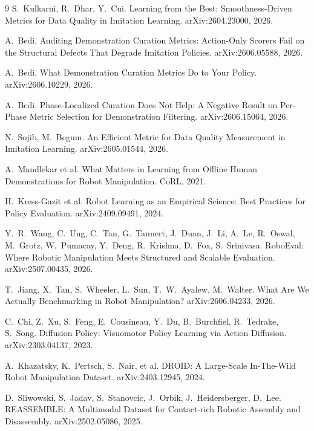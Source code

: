 \documentclass{article}
\begin{document}

\begin{thebibliography}{9}
S.~Kulkarni, R.~Dhar, Y.~Cui.
\newblock Learning from the Best: Smoothness-Driven Metrics for Data Quality
in Imitation Learning.
\newblock arXiv:2604.23000, 2026.

A.~Bedi.
\newblock Auditing Demonstration Curation Metrics: Action-Only Scorers Fail
on the Structural Defects That Degrade Imitation Policies.
\newblock arXiv:2606.05588, 2026.

A.~Bedi.
\newblock What Demonstration Curation Metrics Do to Your Policy.
\newblock arXiv:2606.10229, 2026.

A.~Bedi.
\newblock Phase-Localized Curation Does Not Help: A Negative Result on
Per-Phase Metric Selection for Demonstration Filtering.
\newblock arXiv:2606.15064, 2026.

N.~Sojib, M.~Begum.
\newblock An Efficient Metric for Data Quality Measurement in Imitation
Learning.
\newblock arXiv:2605.01544, 2026.

A.~Mandlekar et al.
\newblock What Matters in Learning from Offline Human Demonstrations for
Robot Manipulation.
\newblock CoRL, 2021.

H.~Kress-Gazit et al.
\newblock Robot Learning as an Empirical Science: Best Practices for Policy
Evaluation.
\newblock arXiv:2409.09491, 2024.

Y.~R.~Wang, C.~Ung, C.~Tan, G.~Tannert, J.~Duan, J.~Li, A.~Le, R.~Oswal,
M.~Grotz, W.~Pumacay, Y.~Deng, R.~Krishna, D.~Fox, S.~Srinivasa.
\newblock RoboEval: Where Robotic Manipulation Meets Structured and Scalable
Evaluation.
\newblock arXiv:2507.00435, 2026.

T.~Jiang, X.~Tan, S.~Wheeler, L.~Sun, T.~W.~Ayalew, M.~Walter.
\newblock What Are We Actually Benchmarking in Robot Manipulation?
\newblock arXiv:2606.04233, 2026.

C.~Chi, Z.~Xu, S.~Feng, E.~Cousineau, Y.~Du, B.~Burchfiel, R.~Tedrake,
S.~Song.
\newblock Diffusion Policy: Visuomotor Policy Learning via Action Diffusion.
\newblock arXiv:2303.04137, 2023.

A.~Khazatsky, K.~Pertsch, S.~Nair, et al.
\newblock DROID: A Large-Scale In-The-Wild Robot Manipulation Dataset.
\newblock arXiv:2403.12945, 2024.

D.~Sliwowski, S.~Jadav, S.~Stanovcic, J.~Orbik, J.~Heidersberger, D.~Lee.
\newblock REASSEMBLE: A Multimodal Dataset for Contact-rich Robotic Assembly
and Disassembly.
\newblock arXiv:2502.05086, 2025.
\end{thebibliography}
\end{document}
